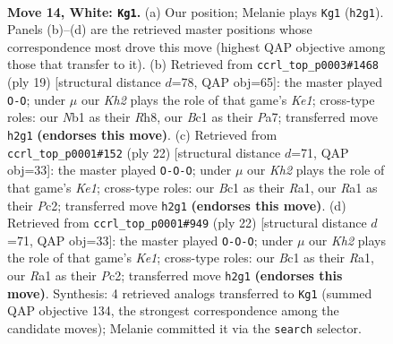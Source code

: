 \documentclass[11pt]{article}
\begin{document}
\clearpage

\begin{figure}[p]\centering
\begin{subfigure}{0.46\textwidth}\centering
\resizebox{\linewidth}{!}{%
\newchessgame
\chessboard[
  setfen={r1bqkb1r/p4ppp/1pn5/4P3/3p3P/1Q3N2/PP3PPK/RNB2R2 w q - 0 14},
  showmover=false,
  pgfstyle=straightmove, color=movearrow, markmove={h2-g1}
]}
\caption{}
\end{subfigure}\hfill
\begin{subfigure}{0.46\textwidth}\centering
\resizebox{\linewidth}{!}{%
\newchessgame
\chessboard[
  setfen={r1b1k2r/ppp1qppp/2n5/3p4/3Pn3/PQ6/1PP1NPPP/R1B1KB1R b KQkq - 2 10},
  showmover=false,
  pgfstyle=straightmove, color=movearrow, markmove={e8-g8}
]}
\caption{}
\end{subfigure}
\\[4pt]
\begin{subfigure}{0.46\textwidth}\centering
\resizebox{\linewidth}{!}{%
\newchessgame
\chessboard[
  setfen={r1bqk2r/pp2bppp/2np4/8/4PQ2/2N2N2/PPP3PP/R3KB1R w KQkq - 1 12},
  showmover=false,
  pgfstyle=straightmove, color=movearrow, markmove={e1-c1}
]}
\caption{}
\end{subfigure}\hfill
\begin{subfigure}{0.46\textwidth}\centering
\resizebox{\linewidth}{!}{%
\newchessgame
\chessboard[
  setfen={r1bqk2r/pp2bppp/2np4/8/4PQ2/2N2N2/PPP3PP/R3KB1R w KQkq - 1 12},
  showmover=false,
  pgfstyle=straightmove, color=movearrow, markmove={e1-c1}
]}
\caption{}
\end{subfigure}
\caption{\textbf{Move 14, White: \texttt{Kg1}.} (a) Our position; Melanie plays \texttt{Kg1} (\texttt{h2g1}). Panels (b)--(d) are the retrieved master positions whose correspondence most drove this move (highest QAP objective among those that transfer to it). (b) Retrieved from \texttt{ccrl\_top\_p0003\#1468} (ply 19) [structural distance $d$=78, QAP obj=65]: the master played \texttt{O-O}; under $\mu$ our \emph{Kh2} plays the role of that game's \emph{Ke1}; cross-type roles: our \emph{N}b1 as their \emph{R}h8, our \emph{B}c1 as their \emph{P}a7; transferred move \texttt{h2g1} \textbf{(endorses this move)}. (c) Retrieved from \texttt{ccrl\_top\_p0001\#152} (ply 22) [structural distance $d$=71, QAP obj=33]: the master played \texttt{O-O-O}; under $\mu$ our \emph{Kh2} plays the role of that game's \emph{Ke1}; cross-type roles: our \emph{B}c1 as their \emph{R}a1, our \emph{R}a1 as their \emph{P}c2; transferred move \texttt{h2g1} \textbf{(endorses this move)}. (d) Retrieved from \texttt{ccrl\_top\_p0001\#949} (ply 22) [structural distance $d$=71, QAP obj=33]: the master played \texttt{O-O-O}; under $\mu$ our \emph{Kh2} plays the role of that game's \emph{Ke1}; cross-type roles: our \emph{B}c1 as their \emph{R}a1, our \emph{R}a1 as their \emph{P}c2; transferred move \texttt{h2g1} \textbf{(endorses this move)}. Synthesis: 4 retrieved analogs transferred to \texttt{Kg1} (summed QAP objective 134, the strongest correspondence among the candidate moves); Melanie committed it via the \texttt{search} selector.}
\label{fig:thought-m26}
\end{figure}
\end{document}

